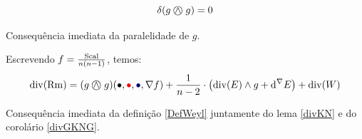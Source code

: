        \begin{lema}\label{divGKNG}
        \[
        \delta(g \mathbin{\bigcirc\mspace{-15mu}\wedge\mspace{4mu}} g) = 0
        \]
        \end{lema}
        \begin{demm}
        Consequência imediata da paralelidade de $g$.
        \end{demm}
        \begin{lema}\label{DivRmHarmonico} Escrevendo $f = \frac{\mathrm{Scal}}{n(n-1)}$, temos:
        \begin{equation}\label{EqDivRmHarmonico}
        \div(\Rm) = (g \KN g)(\bullet, \textcolor{red}{\bullet}, \textcolor{gal}{\bullet}, \nabla f) + \frac{1}{n-2} \cdot \left( \div(E) \wedge g +  \dd^{\nabla} E \right) + \div(W)
        \end{equation}
        \end{lema}
        
        \begin{demm}
        Consequência imediata da definição \cref{DefWeyl} juntamente do lema \cref{divKN} e do corolário \cref{divGKNG}.
        
        \end{demm}
        
